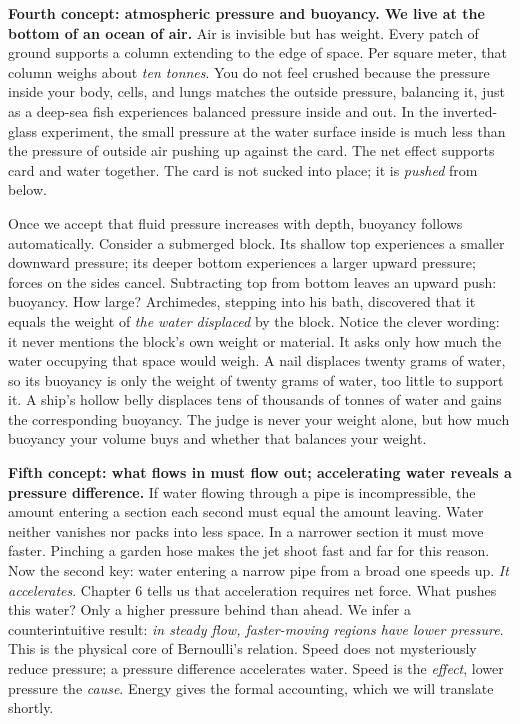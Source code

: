 \begin{mainline}
\textbf{Fourth concept: atmospheric pressure and buoyancy. We live at the bottom of an ocean of air.} Air is invisible but has weight. Every patch of ground supports a column extending to the edge of space. Per square meter, that column weighs about \emph{ten tonnes}. You do not feel crushed because the pressure inside your body, cells, and lungs matches the outside pressure, balancing it, just as a deep-sea fish experiences balanced pressure inside and out. In the inverted-glass experiment, the small pressure at the water surface inside is much less than the pressure of outside air pushing up against the card. The net effect supports card and water together. The card is not sucked into place; it is \emph{pushed} from below.

Once we accept that fluid pressure increases with depth, buoyancy follows automatically. Consider a submerged block. Its shallow top experiences a smaller downward pressure; its deeper bottom experiences a larger upward pressure; forces on the sides cancel. Subtracting top from bottom leaves an upward push: buoyancy. How large? Archimedes, stepping into his bath, discovered that it equals the weight of \emph{the water displaced} by the block. Notice the clever wording: it never mentions the block's own weight or material. It asks only how much the water occupying that space would weigh. A nail displaces twenty grams of water, so its buoyancy is only the weight of twenty grams of water, too little to support it. A ship's hollow belly displaces tens of thousands of tonnes of water and gains the corresponding buoyancy. The judge is never your weight alone, but how much buoyancy your volume buys and whether that balances your weight.

\textbf{Fifth concept: what flows in must flow out; accelerating water reveals a pressure difference.} If water flowing through a pipe is incompressible, the amount entering a section each second must equal the amount leaving. Water neither vanishes nor packs into less space. In a narrower section it must move faster. Pinching a garden hose makes the jet shoot fast and far for this reason. Now the second key: water entering a narrow pipe from a broad one speeds up. \emph{It accelerates}. Chapter 6 tells us that acceleration requires net force. What pushes this water? Only a higher pressure behind than ahead. We infer a counterintuitive result: \emph{in steady flow, faster-moving regions have lower pressure}. This is the physical core of Bernoulli's relation. Speed does not mysteriously reduce pressure; a pressure difference accelerates water. Speed is the \emph{effect}, lower pressure the \emph{cause}. Energy gives the formal accounting, which we will translate shortly.


\end{mainline}
